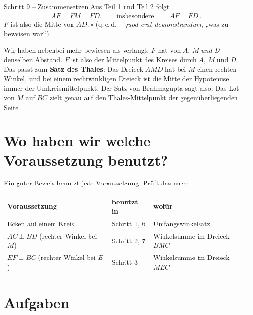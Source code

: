 \documentclass[11pt,a4paper]{article}
\newcommand{\seg}[1]{\overline{#1}}
\begin{document}
\begin{schritt}{Schritt 9 -- Zusammensetzen}
Aus Teil 1 und Teil 2 folgt
\[
  \seg{AF} = \seg{FM} = \seg{FD}, \qquad\text{insbesondere}\qquad \boxed{\;\seg{AF} = \seg{FD}\;}.
\]
$F$ ist also die Mitte von $AD$. \hfill $\square$ \quad (q.\,e.\,d. -- \emph{quod erat demonstrandum}, „was zu beweisen war“)
\end{schritt}

\begin{hinweis}
Wir haben nebenbei mehr bewiesen als verlangt: $F$ hat von $A$, $M$ \emph{und} $D$ denselben Abstand.
$F$ ist also der Mittelpunkt des Kreises durch $A$, $M$ und $D$. Das passt zum \textbf{Satz des Thales}:
Das Dreieck $AMD$ hat bei $M$ einen rechten Winkel, und bei einem rechtwinkligen Dreieck ist die Mitte
der Hypotenuse immer der Umkreismittelpunkt. Der Satz von Brahmagupta sagt also: Das Lot von $M$ auf $BC$
zielt genau auf den Thales-Mittelpunkt der gegen\"uberliegenden Seite.
\end{hinweis}

\section{Wo haben wir welche Voraussetzung benutzt?}

Ein guter Beweis benutzt jede Voraussetzung. Pr\"uft das nach:
\begin{center}
\begin{tabular}{@{}lll@{}}
\textbf{Voraussetzung} & \textbf{benutzt in} & \textbf{wof\"ur} \\ \hline
Ecken auf einem Kreis & Schritt 1, 6 & Umfangswinkelsatz \\
$AC \perp BD$ (rechter Winkel bei $M$) & Schritt 2, 7 & Winkelsumme im Dreieck $BMC$ \\
$EF \perp BC$ (rechter Winkel bei $E$) & Schritt 3 & Winkelsumme im Dreieck $MEC$ \\
\end{tabular}
\end{center}

\section{Aufgaben}
\end{document}
